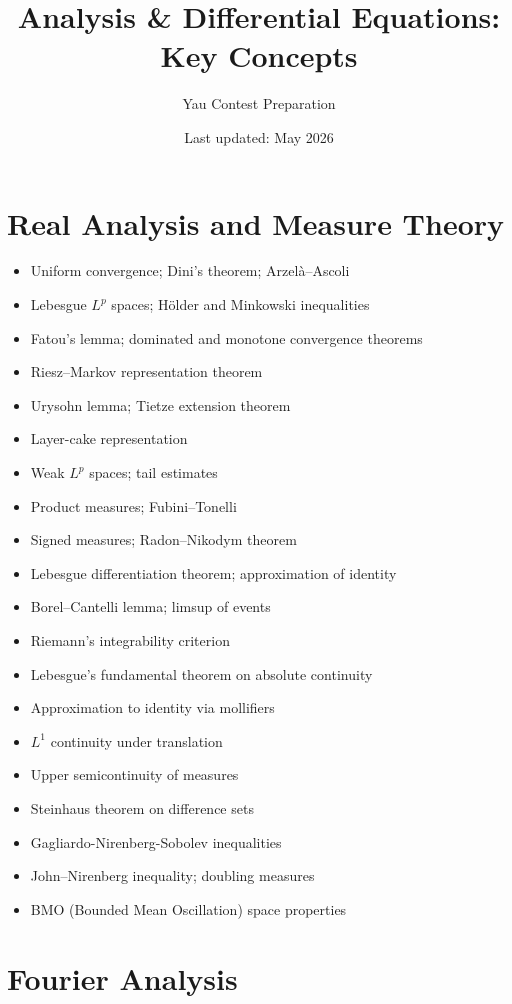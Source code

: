 \documentclass{amsart}
\title{Analysis \& Differential Equations: Key Concepts}
\author{Yau Contest Preparation}
\date{Last updated: May 2026}
\begin{document}
\maketitle

\section{Real Analysis and Measure Theory}

\begin{itemize}
  \item Uniform convergence; Dini's theorem; Arzel\`a--Ascoli
  \item Lebesgue $L^p$ spaces; H\"older and Minkowski inequalities
  \item Fatou's lemma; dominated and monotone convergence theorems
  \item Riesz--Markov representation theorem
  \item Urysohn lemma; Tietze extension theorem
  \item Layer-cake representation
  \item Weak $L^p$ spaces; tail estimates
  \item Product measures; Fubini--Tonelli
  \item Signed measures; Radon--Nikodym theorem
  \item Lebesgue differentiation theorem; approximation of identity
  \item Borel--Cantelli lemma; limsup of events
  \item Riemann's integrability criterion
  \item Lebesgue's fundamental theorem on absolute continuity
  \item Approximation to identity via mollifiers
  \item $L^1$ continuity under translation
  \item Upper semicontinuity of measures
  \item Steinhaus theorem on difference sets
  \item Gagliardo-Nirenberg-Sobolev inequalities
  \item John--Nirenberg inequality; doubling measures
  \item BMO (Bounded Mean Oscillation) space properties
\end{itemize}

\section{Fourier Analysis}
\end{document}
